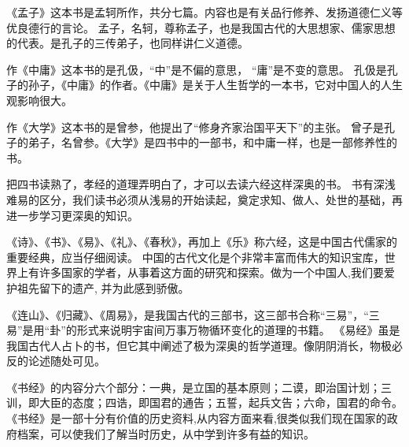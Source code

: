\documentclass[avery5371,grid]{flashcards}
\begin{document}
{《孟子》这本书是孟轲所作，共分七篇。内容也是有关品行修养、发扬道德仁义等优良德行的言论。} %
{孟子，名轲，尊称孟子，也是我国古代的大思想家、儒家思想的代表。是孔子的三传弟子，也同样讲仁义道德。} %

{作《中庸》这本书的是孔伋，“中”是不偏的意思， “庸”是不变的意思。} %
{孔伋是孔子的孙子，《中庸》的作者。《中庸》是关于人生哲学的一本书，它对中国人的人生观影响很大。} %

{作《大学》这本书的是曾参，他提出了“修身齐家治国平天下”的主张。} %
{曾子是孔子的弟子，名曾参。《大学》是四书中的一部书，和中庸一样，也是一部修养性的书。} %


{把四书读熟了，孝经的道理弄明白了，才可以去读六经这样深奥的书。} %
{书有深浅难易的区分，我们读书必须从浅易的开始读起，奠定求知、做人、处世的基础，再进一步学习更深奥的知识。} %


{《诗》、《书》、《易》、《礼》、《春秋》，再加上《乐》称六经，这是中国古代儒家的重要经典，应当仔细阅读。} %
{中国的古代文化是个非常丰富而伟大的知识宝库，世界上有许多国家的学者，从事着这方面的研究和探索。做为一个中国人,我们要爱护祖先留下的遗产, 并为此感到骄傲。} %

{《连山》、《归藏》、《周易》，是我国古代的三部书，这三部书合称“三易”，“三易”是用“卦”的形式来说明宇宙间万事万物循环变化的道理的书籍。} %
{《易经》虽是我国古代人占卜的书，但它其中阐述了极为深奥的哲学道理。像阴阴消长，物极必反的论述随处可见。} %

{《书经》的内容分六个部分：一典，是立国的基本原则；二谟，即治国计划；三训，即大臣的态度；四诰，即国君的通告；五誓，起兵文告；六命，国君的命令。} %
{《书经》是一部十分有价值的历史资料,从内容方面来看,很类似我们现在国家的政府档案，可以使我们了解当时历史，从中学到许多有益的知识。} %
\end{document}
